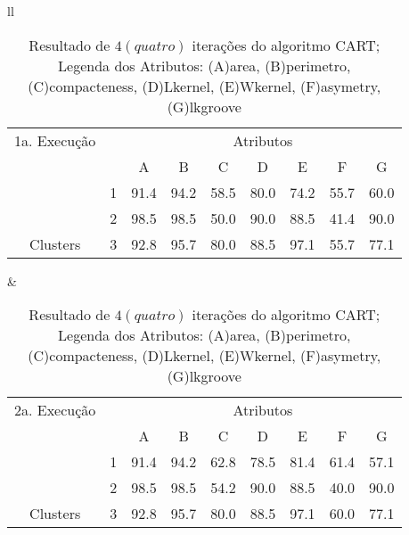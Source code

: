 \begin{table}[!h]
\caption{Resultado de ${4(quatro)}$ iterações do algoritmo CART; Legenda dos Atributos: (A)area, (B)perimetro, (C)compacteness, (D)Lkernel, (E)Wkernel, (F)asymetry, (G)lkgroove}
 \begin{tabular}{ll}

  
   \small\addtolength{\tabcolsep}{-5pt}
     \begin{tabular}{|cl|c|c|c|c|c|c|c|}
        \hline \hline
           {\tiny  1a. Execução}      &   & \multicolumn{7}{c|}{Atributos}                                               \\ \cline{3-9} 
       \multicolumn{1}{|l}{}                            &   & A    & B & C & D & E & F & G \\ \hline
        \multicolumn{1}{|c|}{}                           & 1 & 91.4 & 94.2   & 58.5      & 80.0 & 74.2 & 55.7   & 60.0   \\ \cline{2-9} 
        \multicolumn{1}{|c|}{}                           & 2 & 98.5 & 98.5   & 50.0      & 90.0 & 88.5 & 41.4  & 90.0  \\ \cline{2-9} 
        \multicolumn{1}{|c|}{\multirow{-3}{*}{Clusters}} & 3 & 92.8 & 95.7   & 80.0      & 88.5 & 97.1 & 55.7  & 77.1  \\ \hline
      \end{tabular}
 &
 
   
   \small\addtolength{\tabcolsep}{-5pt}
   \begin{tabular}{|cl|c|c|c|c|c|c|c|}
        \hline \hline
         {\tiny  2a. Execução} &   & \multicolumn{7}{c|}{Atributos}                                               \\ \cline{3-9} 
       \multicolumn{1}{|l}{}                            &   & A    & B & C & D & E & F & G \\ \hline
        \multicolumn{1}{|c|}{}                           & 1 &  91.4 & 94.2   & 62.8      & 78.5 & 81.4 & 61.4   & 57.1   \\ \cline{2-9} 
        \multicolumn{1}{|c|}{}                           & 2 & 98.5 & 98.5   & 54.2      & 90.0 & 88.5 & 40.0  & 90.0  \\ \cline{2-9} 
        \multicolumn{1}{|c|}{\multirow{-3}{*}{Clusters}} & 3 & 92.8 & 95.7   & 80.0      & 88.5 & 97.1 & 60.0  & 77.1  \\ \hline
      \end{tabular}
  \\  [8ex]
 

\end{tabular}
\end{table}
